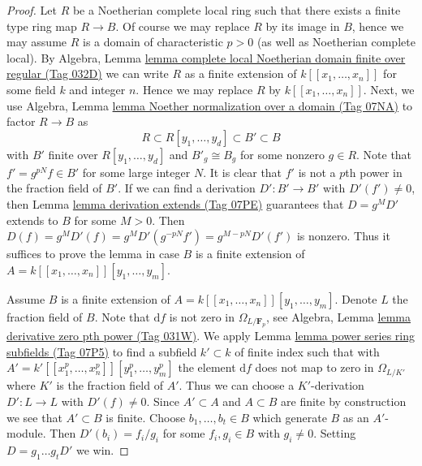 \documentclass{amsart}
\theoremstyle{plain}
\theoremstyle{definition}
\theoremstyle{remark}
\numberwithin{equation}{subsection}
\begin{document}
\begin{proof}
Let $R$ be a Noetherian complete local ring such that there exists
a finite type ring map $R \to B$. Of course we may replace $R$ by
its image in $B$, hence we may assume $R$ is a domain of characteristic
$p > 0$ (as well as Noetherian complete local). By Algebra, Lemma
\href{https://stacks.math.columbia.edu/tag/032D}{lemma complete local Noetherian domain finite over regular (Tag 032D)}
we can write $R$ as a finite extension of $k[[x_1, \ldots, x_n]]$ for some
field $k$ and integer $n$. Hence we may replace $R$ by $k[[x_1, \ldots, x_n]]$.
Next, we use
Algebra, Lemma \href{https://stacks.math.columbia.edu/tag/07NA}{lemma Noether normalization over a domain (Tag 07NA)}
to factor $R \to B$ as
$$
R \subset R[y_1, \ldots, y_d] \subset B' \subset B
$$
with $B'$ finite over $R[y_1, \ldots, y_d]$ and $B'_g \cong B_g$
for some nonzero $g \in R$. Note that $f' = g^{pN} f \in B'$ for some
large integer $N$. It is clear that $f'$ is not a $p$th power in
the fraction field of $B'$. If we can find a derivation
$D' : B' \to B'$ with $D'(f') \not = 0$, then
Lemma \href{https://stacks.math.columbia.edu/tag/07PE}{lemma derivation extends (Tag 07PE)}
guarantees that $D = g^MD'$ extends to $B$ for some $M > 0$. Then
$D(f) = g^MD'(f) = g^MD'(g^{-pN}f') = g^{M - pN}D'(f')$ is nonzero.
Thus it suffices to prove the lemma in case
$B$ is a finite extension of $A = k[[x_1, \ldots, x_n]][y_1, \ldots, y_m]$.

\medskip\noindent
Assume $B$ is a finite extension of
$A = k[[x_1, \ldots, x_n]][y_1, \ldots, y_m]$.
Denote $L$ the fraction field of $B$.
Note that $\text{d}f$ is not zero in $\Omega_{L/\mathbf{F}_p}$, see
Algebra, Lemma \href{https://stacks.math.columbia.edu/tag/031W}{lemma derivative zero pth power (Tag 031W)}.
We apply Lemma \href{https://stacks.math.columbia.edu/tag/07P5}{lemma power series ring subfields (Tag 07P5)} to find a subfield
$k' \subset k$ of finite index such that with
$A' = k'[[x_1^p, \ldots, x_n^p]][y_1^p, \ldots, y_m^p]$
the element $\text{d}f$ does not map to zero in $\Omega_{L/K'}$
where $K'$ is the fraction field of $A'$.
Thus we can choose a $K'$-derivation $D' : L \to L$
with $D'(f) \not = 0$. Since $A' \subset A$ and $A \subset B$ are
finite by construction we see that $A' \subset B$ is finite.
Choose $b_1, \ldots, b_t \in B$ which generate $B$ as an $A'$-module.
Then $D'(b_i) = f_i/g_i$ for some $f_i, g_i \in B$ with $g_i \not = 0$.
Setting $D = g_1 \ldots g_t D'$ we win.
\end{proof}
\end{document}
